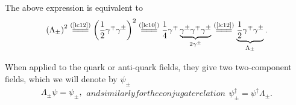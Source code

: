 \begin{note}\noindent
The above expression is equivalent to
\begin{align*}
\left(\Lambda_\pm\right)^2\stackrel{(\text{\cref{lc12}})}{=\joinrel=\joinrel=}\left(\frac{1}{2}\gamma^\mp\gamma^\pm\right)^2\stackrel{(\text{\cref{lc10}})}{=\joinrel=\joinrel=}\frac{1}{4}\gamma^\mp\underbrace{\gamma^\pm\gamma^\mp\gamma^\pm}_{2\gamma^\pm}\stackrel{(\text{\cref{lc12}})}{=\joinrel=\joinrel=}\underbrace{\frac{1}{2}\gamma^\mp\gamma^\pm}_{\Lambda_\pm}.
\end{align*}
\end{note}
\noindent
When applied to the quark or anti-quark fields, they give two two-component fields, which we will denote by $\psi_\pm$
\begin{subequations}
\begin{align}
\Lambda_\pm\psi=\psi_\pm,\label{lc15a}
\end{align}
and similarly for the conjugate relation
\begin{align}
\psi^\dag_\pm=\psi^\dag\Lambda_\pm.\label{lc15b}
\end{align}
\end{subequations}

